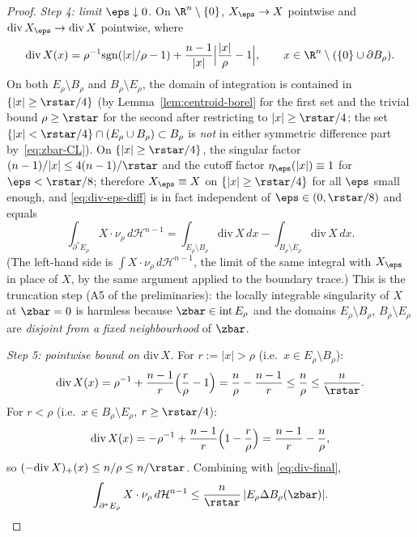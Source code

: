 \begin{proof}
\emph{Step 4: limit $\eps\downarrow0$.} On $\R^n\setminus\{0\}$,
$X_\eps\to X$ pointwise and $\mathrm{div}\,X_\eps\to\mathrm{div}\,X$
pointwise, where
\begin{equation}\label{eq:divX}
   \mathrm{div}\,X(x)=
   \rho^{-1}\mathrm{sgn}(|x|/\rho-1)+\frac{n-1}{|x|}\Bigl|\frac{|x|}{\rho}-1\Bigr|,
   \qquad x\in\R^n\setminus(\{0\}\cup\partial B_\rho).
\end{equation}
On both $E_\rho\setminus B_\rho$ and $B_\rho\setminus E_\rho$, the
domain of integration is contained in $\{|x|\ge\rstar/4\}$ (by
Lemma~\ref{lem:centroid-borel} for the first set and the trivial bound
$\rho\ge\rstar$ for the second after restricting to $|x|\ge\rstar/4$;
the set $\{|x|<\rstar/4\}\cap(E_\rho\cup B_\rho)\subset B_\rho$ is
\emph{not} in either symmetric difference part by~\eqref{eq:zbar-CL}).
On $\{|x|\ge\rstar/4\}$, the singular factor
$(n-1)/|x|\le 4(n-1)/\rstar$ and the cutoff factor $\eta_\eps(|x|)\equiv1$
for $\eps<\rstar/8$; therefore $X_\eps\equiv X$ on
$\{|x|\ge\rstar/4\}$ for all $\eps$ small enough, and
\eqref{eq:div-eps-diff} is in fact independent of $\eps\in(0,\rstar/8)$
and equals
\begin{equation}\label{eq:div-final}
   \int_{\partial^*E_\rho}X\cdot\nu_\rho\,d\mathcal H^{n-1}
   =\int_{E_\rho\setminus B_\rho}\!\!\!\mathrm{div}\,X\,dx
    -\int_{B_\rho\setminus E_\rho}\!\!\!\mathrm{div}\,X\,dx.
\end{equation}
(The left-hand side is $\int X\cdot\nu_\rho\,d\mathcal H^{n-1}$, the limit
of the same integral with $X_\eps$ in place of $X$, by the same argument
applied to the boundary trace.) This is the truncation step (A5 of the
preliminaries): the locally integrable singularity of $X$ at $\zbar=0$
is harmless because $\zbar\in\mathrm{int}\,E_\rho$ and the domains
$E_\rho\setminus B_\rho$, $B_\rho\setminus E_\rho$ are
\emph{disjoint from a fixed neighbourhood} of $\zbar$.

\emph{Step 5: pointwise bound on $\mathrm{div}\,X$.}
For $r:=|x|>\rho$ (i.e.\ $x\in E_\rho\setminus B_\rho$):
\begin{equation}\label{eq:divX-out}
   \mathrm{div}\,X(x)
   =\rho^{-1}+\frac{n-1}{r}\Bigl(\frac{r}{\rho}-1\Bigr)
   =\frac{n}{\rho}-\frac{n-1}{r}
   \le\frac{n}{\rho}\le\frac{n}{\rstar}.
\end{equation}
For $r<\rho$ (i.e.\ $x\in B_\rho\setminus E_\rho$, $r\ge\rstar/4$):
\begin{equation}\label{eq:divX-in}
   \mathrm{div}\,X(x)
   =-\rho^{-1}+\frac{n-1}{r}\Bigl(1-\frac{r}{\rho}\Bigr)
   =\frac{n-1}{r}-\frac{n}{\rho},
\end{equation}
so
$(-\mathrm{div}\,X)_+(x)\le n/\rho\le n/\rstar$. Combining with
\eqref{eq:div-final},
\begin{equation}\label{eq:T-rad-bound}
   \int_{\partial^*E_\rho}X\cdot\nu_\rho\,d\mathcal H^{n-1}
   \le\frac{n}{\rstar}\,|E_\rho\Delta B_\rho(\zbar)|.
\end{equation}


\end{proof}
